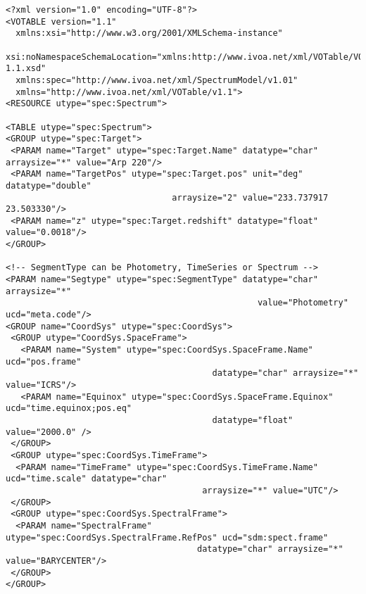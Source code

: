 { \footnotesize
\begin{flushleft}


\begin{fmpage}

\begin{verbatim}
<?xml version="1.0" encoding="UTF-8"?>
<VOTABLE version="1.1"
  xmlns:xsi="http://www.w3.org/2001/XMLSchema-instance"
  xsi:noNamespaceSchemaLocation="xmlns:http://www.ivoa.net/xml/VOTable/VOTable-1.1.xsd" 
  xmlns:spec="http://www.ivoa.net/xml/SpectrumModel/v1.01"
  xmlns="http://www.ivoa.net/xml/VOTable/v1.1">
<RESOURCE utype="spec:Spectrum">

<TABLE utype="spec:Spectrum">   
<GROUP utype="spec:Target">
 <PARAM name="Target" utype="spec:Target.Name" datatype="char" arraysize="*" value="Arp 220"/>
 <PARAM name="TargetPos" utype="spec:Target.pos" unit="deg" datatype="double" 
                                 arraysize="2" value="233.737917 23.503330"/>
 <PARAM name="z" utype="spec:Target.redshift" datatype="float" value="0.0018"/>
</GROUP>

<!-- SegmentType can be Photometry, TimeSeries or Spectrum -->
<PARAM name="Segtype" utype="spec:SegmentType" datatype="char" arraysize="*" 
                                                  value="Photometry" ucd="meta.code"/>
<GROUP name="CoordSys" utype="spec:CoordSys">
 <GROUP utype="CoordSys.SpaceFrame">
   <PARAM name="System" utype="spec:CoordSys.SpaceFrame.Name" ucd="pos.frame" 
                                         datatype="char" arraysize="*" value="ICRS"/>
   <PARAM name="Equinox" utype="spec:CoordSys.SpaceFrame.Equinox" ucd="time.equinox;pos.eq" 
                                         datatype="float" value="2000.0" />
 </GROUP>
 <GROUP utype="spec:CoordSys.TimeFrame">
  <PARAM name="TimeFrame" utype="spec:CoordSys.TimeFrame.Name" ucd="time.scale" datatype="char" 
                                       arraysize="*" value="UTC"/>
 </GROUP>
 <GROUP utype="spec:CoordSys.SpectralFrame">
  <PARAM name="SpectralFrame" utype="spec:CoordSys.SpectralFrame.RefPos" ucd="sdm:spect.frame" 
                                      datatype="char" arraysize="*" value="BARYCENTER"/>
 </GROUP>
</GROUP>

\end{verbatim}
\end{fmpage}

\begin{fmpage}
\begin{verbatim}



\end{verbatim}
\end{fmpage}
\end{flushleft}}
